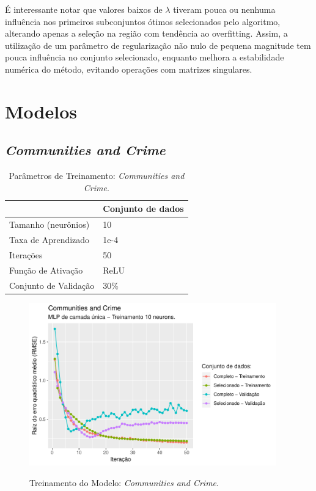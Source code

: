 É interessante notar que valores baixos de $\lambda$ tiveram pouca ou nenhuma influência nos primeiros subconjuntos ótimos selecionados pelo algoritmo, alterando apenas a seleção na região com tendência ao overfitting. Assim, a utilização de um parâmetro de regularização não nulo de pequena magnitude tem pouca influência no conjunto selecionado, enquanto melhora a estabilidade numérica do método, evitando operações com matrizes singulares.


\FloatBarrier
\section{Modelos}

\subsection{\textit{Communities and Crime}}

\begin{table}[!htb]
    \caption{Parâmetros de Treinamento: \textit{Communities and Crime}.}
    \begin{center}        
        \begin{tabular}{@{}ll@{}}
        \toprule
                            & Conjunto de dados \\ \midrule
        Tamanho (neurônios)     & 10                \\
        Taxa de Aprendizado   & 1e-4              \\
        Iterações             & 50                \\
        Função de Ativação    & ReLU              \\
        Conjunto de Validação & $30\%$            \\ \bottomrule
        \end{tabular}
    \end{center}
    \label{tbl:treinamento_comm_crime}
\end{table}

\begin{figure}[!htb]
    \centering
    \caption{Treinamento do Modelo: \textit{Communities and Crime}.}
    \includegraphics[height=200pt]{imgs/res/CommunitiesandCrime_model.pdf}
    \label{fig:modelo_CommunitiesandCrime_model}
\end{figure}

